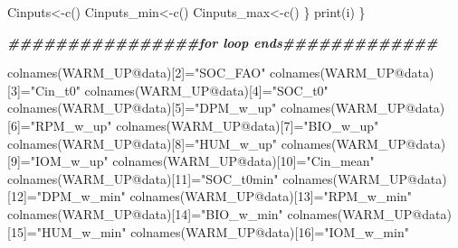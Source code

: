 \documentclass[
  10pt,
  b5paper,
]{book}
\newenvironment{Shaded}{\begin{snugshade}}{\end{snugshade}}
\newcommand{\DecValTok}[1]{\textcolor[rgb]{0.00,0.00,0.81}{#1}}
\newcommand{\DocumentationTok}[1]{\textcolor[rgb]{0.56,0.35,0.01}{\textbf{\textit{#1}}}}
\newcommand{\FunctionTok}[1]{\textcolor[rgb]{0.00,0.00,0.00}{#1}}
\newcommand{\NormalTok}[1]{#1}
\newcommand{\OtherTok}[1]{\textcolor[rgb]{0.56,0.35,0.01}{#1}}
\newcommand{\SpecialCharTok}[1]{\textcolor[rgb]{0.00,0.00,0.00}{#1}}
\newcommand{\StringTok}[1]{\textcolor[rgb]{0.31,0.60,0.02}{#1}}
\begin{document}
\begin{Shaded}
\begin{Highlighting}[]
\NormalTok{Cinputs}\OtherTok{\textless{}{-}}\FunctionTok{c}\NormalTok{()}
\NormalTok{Cinputs\_min}\OtherTok{\textless{}{-}}\FunctionTok{c}\NormalTok{()}
\NormalTok{Cinputs\_max}\OtherTok{\textless{}{-}}\FunctionTok{c}\NormalTok{()}
\NormalTok{\}}
\FunctionTok{print}\NormalTok{(i)}
\NormalTok{\}}

\DocumentationTok{\#\#\#\#\#\#\#\#\#\#\#\#\#\#\#\#for loop ends\#\#\#\#\#\#\#\#\#\#\#\#\#}

\FunctionTok{colnames}\NormalTok{(WARM\_UP}\SpecialCharTok{@}\NormalTok{data)[}\DecValTok{2}\NormalTok{]}\OtherTok{=}\StringTok{"SOC\_FAO"}
\FunctionTok{colnames}\NormalTok{(WARM\_UP}\SpecialCharTok{@}\NormalTok{data)[}\DecValTok{3}\NormalTok{]}\OtherTok{=}\StringTok{"Cin\_t0"}
\FunctionTok{colnames}\NormalTok{(WARM\_UP}\SpecialCharTok{@}\NormalTok{data)[}\DecValTok{4}\NormalTok{]}\OtherTok{=}\StringTok{"SOC\_t0"}
\FunctionTok{colnames}\NormalTok{(WARM\_UP}\SpecialCharTok{@}\NormalTok{data)[}\DecValTok{5}\NormalTok{]}\OtherTok{=}\StringTok{"DPM\_w\_up"}
\FunctionTok{colnames}\NormalTok{(WARM\_UP}\SpecialCharTok{@}\NormalTok{data)[}\DecValTok{6}\NormalTok{]}\OtherTok{=}\StringTok{"RPM\_w\_up"}
\FunctionTok{colnames}\NormalTok{(WARM\_UP}\SpecialCharTok{@}\NormalTok{data)[}\DecValTok{7}\NormalTok{]}\OtherTok{=}\StringTok{"BIO\_w\_up"}
\FunctionTok{colnames}\NormalTok{(WARM\_UP}\SpecialCharTok{@}\NormalTok{data)[}\DecValTok{8}\NormalTok{]}\OtherTok{=}\StringTok{"HUM\_w\_up"}
\FunctionTok{colnames}\NormalTok{(WARM\_UP}\SpecialCharTok{@}\NormalTok{data)[}\DecValTok{9}\NormalTok{]}\OtherTok{=}\StringTok{"IOM\_w\_up"}
\FunctionTok{colnames}\NormalTok{(WARM\_UP}\SpecialCharTok{@}\NormalTok{data)[}\DecValTok{10}\NormalTok{]}\OtherTok{=}\StringTok{"Cin\_mean"}
\FunctionTok{colnames}\NormalTok{(WARM\_UP}\SpecialCharTok{@}\NormalTok{data)[}\DecValTok{11}\NormalTok{]}\OtherTok{=}\StringTok{"SOC\_t0min"}
\FunctionTok{colnames}\NormalTok{(WARM\_UP}\SpecialCharTok{@}\NormalTok{data)[}\DecValTok{12}\NormalTok{]}\OtherTok{=}\StringTok{"DPM\_w\_min"}
\FunctionTok{colnames}\NormalTok{(WARM\_UP}\SpecialCharTok{@}\NormalTok{data)[}\DecValTok{13}\NormalTok{]}\OtherTok{=}\StringTok{"RPM\_w\_min"}
\FunctionTok{colnames}\NormalTok{(WARM\_UP}\SpecialCharTok{@}\NormalTok{data)[}\DecValTok{14}\NormalTok{]}\OtherTok{=}\StringTok{"BIO\_w\_min"}
\FunctionTok{colnames}\NormalTok{(WARM\_UP}\SpecialCharTok{@}\NormalTok{data)[}\DecValTok{15}\NormalTok{]}\OtherTok{=}\StringTok{"HUM\_w\_min"}
\FunctionTok{colnames}\NormalTok{(WARM\_UP}\SpecialCharTok{@}\NormalTok{data)[}\DecValTok{16}\NormalTok{]}\OtherTok{=}\StringTok{"IOM\_w\_min"}

\end{Highlighting}
\end{Shaded}
\end{document}
